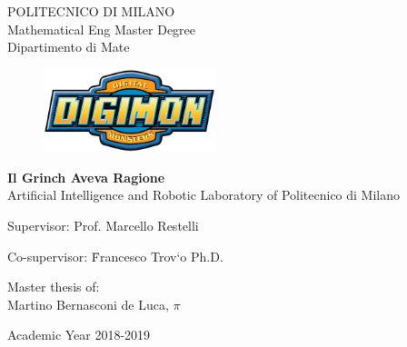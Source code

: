 \thispagestyle{empty}
\vspace*{-1.5cm}
 \bfseries{
\begin{center}
  \large
  POLITECNICO DI MILANO\\
  \normalsize
  Mathematical Eng Master Degree\\
  Dipartimento di Mate\\
  \begin{figure}[htbp]
    \begin{center}
      \includegraphics[width=5cm]{./img/logo/digi3.png}
    \end{center}
  \end{figure}
  \vspace*{0.1cm} \LARGE


    \textbf{Il Grinch Aveva Ragione}\\


  \vspace*{.75truecm} \large
  Artificial Intelligence and Robotic Laboratory \newline of Politecnico di Milano
\end{center}
\vspace*{2.0cm} \large
\begin{flushleft}


  Supervisor: Prof. Marcello Restelli \\

  \begin{tabbing}  
      Co-supervisor: \=  Francesco Trov\a`{o} Ph.D.\\
  \end{tabbing}
\end{flushleft}
\vspace*{1.0cm}
\begin{flushright}


  Master thesis of:\\ Martino Bernasconi de Luca, $\pi$\\


\end{flushright}
\vspace*{0.8cm}
\begin{center}

  Academic Year 2018-2019 %
\end{center} \clearpage
}
